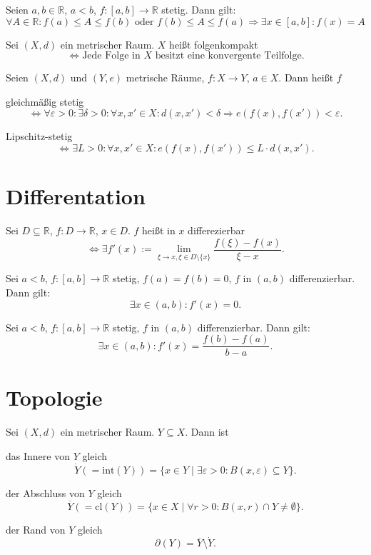 \documentclass[]{scrartcl}
\newcommand{\R}{\ensuremath{\mathbb{R}}}
\begin{document}
\begin{satz}[Zwischenwertsatz]
Seien $a,b\in\R$, $a<b$, $f:\left[a,b\right]\to\R$ stetig. Dann gilt:
\[\forall A\in\R:f(a)\leq A\leq f(b)\text{ oder } f(b)\leq A\leq f(a) \Rightarrow \exists x\in\left[a,b\right]:f(x)=A\]
\end{satz}

\begin{definition}[Folgenkompakt]
Sei $(X,d)$ ein metrischer Raum. $X$ hei\ss t folgenkompakt
\[\Leftrightarrow\text{Jede Folge in $X$ besitzt eine konvergente Teilfolge.}\]
\end{definition}

\begin{definition}
Seien $(X,d)$ und $(Y,e)$ metrische R\"aume, $f:X\to Y$, $a\in X$. Dann hei\ss t $f$

gleichm\"a\ss ig stetig
\[\Leftrightarrow\forall\varepsilon>0:\exists\delta>0:\forall x,x'\in X:d(x,x')<\delta\Rightarrow e(f(x),f(x'))<\varepsilon.\]

Lipschitz-stetig
\[\Leftrightarrow\exists L>0:\forall x,x'\in X:e(f(x),f(x'))\leq L\cdot d(x,x').\]
\end{definition}

\section*{Differentation}
\begin{definition}[Differenzierbar]
Sei $D\subseteq\R$, $f:D\to\R$, $x\in D$. $f$ hei\ss t in $x$ differezierbar
\[\Leftrightarrow\exists f'(x):=\lim\limits_{\xi\to x,\xi\in D\setminus\{x\}}\frac{f(\xi)-f(x)}{\xi-x}.\]
\end{definition}

\begin{satz}
Sei $a<b$, $f:\left[a,b\right]\to\R$ stetig, $f(a)=f(b)=0$, $f$ in $(a,b)$ differenzierbar. Dann gilt:
\[\exists x\in(a,b):f'(x)=0.\]
\end{satz}

\begin{satz}[Mittelwertsatz]
Sei $a<b$, $f:\left[a,b\right]\to\R$ stetig, $f$ in $(a,b)$ differenzierbar. Dann gilt:
\[\exists x\in(a,b):f'(x)=\frac{f(b)-f(a)}{b-a}.\]
\end{satz}

\section*{Topologie}
\begin{definition}
Sei $(X,d)$ ein metrischer Raum. $Y\subseteq X$. Dann ist

das Innere von $Y$ gleich
\[\dot{Y}(=\text{int}(Y))=\{x\in Y\mid \exists\varepsilon>0:B(x,\varepsilon)\subseteq Y\}.\]

der Abschluss von $Y$ gleich
\[\overline{Y}(=\text{cl}(Y))=\{x\in X\mid \forall r>0:B(x,r)\cap Y\neq\emptyset\}.\]

der Rand von $Y$ gleich
\[\partial(Y)=\overline{Y}\setminus\dot{Y}.\]
\end{definition}
\end{document}
